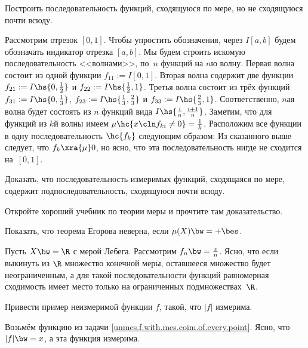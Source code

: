 \documentclass[a4paper]{article}
\begin{document}
\begin{problem}
  Построить последовательность функций, сходящуюся по мере, но не сходящуюся почти всюду.
\end{problem}
\begin{solution}
  Рассмотрим отрезок $[0,1]$. Чтобы упростить обозначения, через $I[a,b]$ будем обозначать
  индикатор отрезка $[a,b]$. Мы будем строить искомую последовательность <<волнами>>, по~$n$
  функций на $n$\д ю волну. Первая волна состоит из одной функции $f_{11} := I[0,1]$. Вторая
  волна содержит две функции $f_{21} := I\hs{0,\frac12}$ и $f_{22} := I\hs{\frac12,1}$.
  Третья волна состоит из трёх функций $f_{31} := I\hs{0,\frac13}$, $f_{23} := I\hs{\frac13,\frac23}$
  и $f_{33} := I\hs{\frac23,1}$. Соответственно, $n$\д ая волна будет состоять из $n$ функций
  вида $I\hs{\frac in,\frac{i+1}n}$. Заметим, что для функций из $k$\д й волны имеем
  $\mu\hc{x\cln f_{ki} \neq 0} = \frac1k$. Расположим все функции в одну последовательность
  $\hc{f_k}$ следующим образом:
  Из сказанного выше следует, что $f_k \xra{\mu} 0$, но ясно, что эта последовательность нигде не сходится
  на~$[0,1]$.
\end{solution}

\begin{problem}
  Доказать, что последовательность измеримых функций, сходящаяся по мере, содержит
  подпоследовательность, сходящуюся почти всюду.
\end{problem}
\begin{solution}
  Откройте хороший учебник по теории меры и прочтите там доказательство.
\end{solution}

\begin{problem}
  Показать, что теорема Егорова неверна, если $\mu(X) \bw= +\bes$.
\end{problem}
\begin{solution}
  Пусть $X \bw= \R$ с мерой Лебега. Рассмотрим $f_n \bw= \frac xn$. Ясно, что
  если выкинуть из $\R$ множество конечной меры, оставшееся множество будет неограниченным,
  а для такой последовательности функций равномерная сходимость имеет место только
  на ограниченных подмножествах~$\R$.
\end{solution}

\begin{problem}
  Привести пример неизмеримой функции $f$, такой, что $|f|$ измерима.
\end{problem}
\begin{solution}
  Возьмём функцию из задачи \ref{unmes.f.with.mes.coim.of.every.point}. Ясно, что
  $|f| \bw= x$, а эта функция измерима.
\end{solution}
\end{document}

